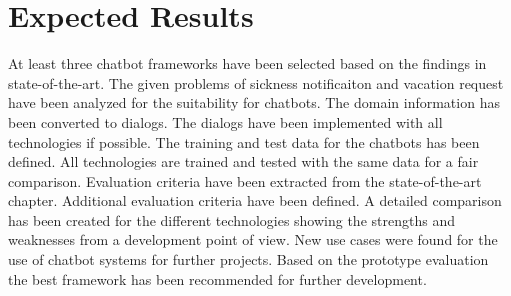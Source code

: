 \section{Expected Results}
At least three chatbot frameworks have been selected based on the findings in 
state-of-the-art.
The given problems of sickness notificaiton and vacation request have been analyzed 
for the suitability for chatbots.
The domain information has been converted to dialogs.
The dialogs have been implemented with all technologies if possible.
The training and test data for the chatbots has been defined.
All technologies are trained and tested with the same data for a fair comparison.
Evaluation criteria have been extracted from the state-of-the-art chapter.
Additional evaluation criteria have been defined.
A detailed comparison has been created for the different technologies showing the strengths 
and weaknesses from a development point of view.
New use cases were found for the use of chatbot systems for further projects.
Based on the prototype evaluation the best framework has been recommended for further development.